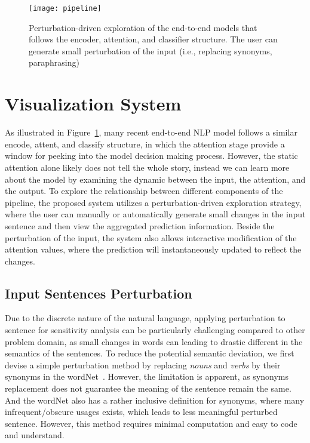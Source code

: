 
\begin{figure}[htbp]
\centering
\vspace{-2mm}
 \texttt{[image: pipeline]}
 \caption{
 Perturbation-driven exploration of the end-to-end models that follows the encoder, attention, and classifier structure. The user can generate small perturbation of the input (i.e., replacing synonyms, paraphrasing)
 }
\label{fig:modelPipeline}
\end{figure}

\section{Visualization System}
As illustrated in Figure~\ref{fig:modelPipeline}, many recent end-to-end NLP model follows a similar encode, attent, and classify structure, in which the attention stage provide a window for peeking into the model decision making process. However, the static attention alone likely does not tell the whole story, instead we can learn more about the model by examining the dynamic between the input, the attention, and the output. To explore the relationship between different components of the pipeline, the proposed system utilizes a perturbation-driven exploration strategy, where the  user can manually or automatically generate small changes in the input sentence and then view the aggregated prediction information. Beside the perturbation of the input, the system also allows interactive modification of the attention values, where the prediction will instantaneously updated to reflect the changes. 
%

\subsection{Input Sentences Perturbation}
\label{sec:perturb}
Due to the discrete nature of the natural language, applying perturbation to sentence for sensitivity analysis can be particularly challenging compared to other problem domain, as small changes in words can leading to drastic different in the semantics of the sentences.
To reduce the potential semantic deviation, we first devise a simple perturbation method by replacing \emph{nouns} and \emph{verbs} by their synonyms in the wordNet~\cite{Miller1995}. However, the limitation is apparent, as synonyms replacement does not guarantee the meaning of the sentence remain the same. And the wordNet also has a rather inclusive definition for synonyms, where many infrequent/obscure usages exists, which leads to less meaningful perturbed sentence. However, this method requires minimal computation and easy to code and understand. 


